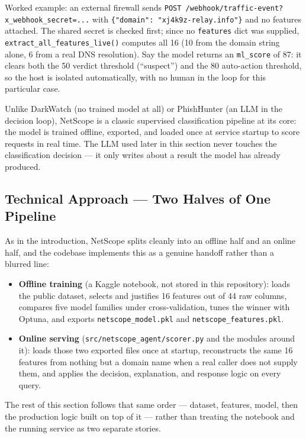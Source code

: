 \documentclass[12pt,a4paper]{report}
\begin{document}
Worked example: an external firewall sends \texttt{POST /webhook/traffic-event?x\_webhook\_secret=...} with \texttt{\{"domain": "xj4k9z-relay.info"\}} and no features attached. The shared secret is checked first; since no \texttt{features} dict was supplied, \texttt{extract\_all\_features\_live()} computes all 16 (10 from the domain string alone, 6 from a real DNS resolution). Say the model returns an \texttt{ml\_score} of 87: it clears both the 50 verdict threshold (``suspect'') and the 80 auto-action threshold, so the host is isolated automatically, with no human in the loop for this particular case.

Unlike DarkWatch (no trained model at all) or PhishHunter (an LLM in the decision loop), NetScope is a classic supervised classification pipeline at its core: the model is trained offline, exported, and loaded once at service startup to score requests in real time. The LLM used later in this section never touches the classification decision --- it only writes about a result the model has already produced.

\subsection*{Technical Approach --- Two Halves of One Pipeline}
As in the introduction, NetScope splits cleanly into an offline half and an online half, and the codebase implements this as a genuine handoff rather than a blurred line:

\begin{itemize}[nosep]
\item \textbf{Offline training} (a Kaggle notebook, not stored in this repository): loads the public dataset, selects and justifies 16 features out of 44 raw columns, compares five model families under cross-validation, tunes the winner with Optuna, and exports \texttt{netscope\_model.pkl} and \texttt{netscope\_features.pkl}.
\item \textbf{Online serving} (\texttt{src/netscope\_agent/scorer.py} and the modules around it): loads those two exported files once at startup, reconstructs the same 16 features from nothing but a domain name when a real caller does not supply them, and applies the decision, explanation, and response logic on every query.
\end{itemize}

The rest of this section follows that same order --- dataset, features, model, then the production logic built on top of it --- rather than treating the notebook and the running service as two separate stories.
\end{document}
